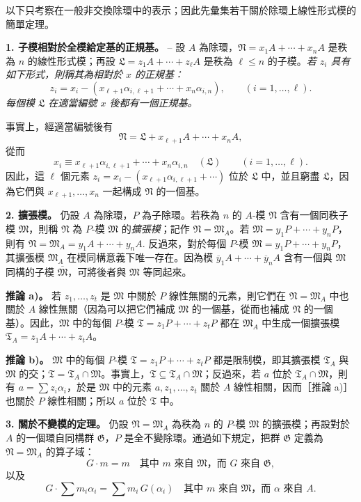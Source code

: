 \documentclass[11pt]{article}
\providecommand{\frT}{\mathfrak T}
\providecommand{\frM}{\mathfrak M}
\providecommand{\frN}{\mathfrak N}
\providecommand{\frG}{\mathfrak G}
\providecommand{\frL}{\mathfrak L}
\begin{document}
以下只考察在一般非交換除環中的表示；因此先彙集若干關於除環上線性形式模的簡單定理。

\noindent\textbf{1. 子模相對於全模給定基的正規基。} -- 設 \(A\) 為除環，\(\frN=x_1A+\cdots+x_nA\) 是秩為 \(n\) 的線性形式模；再設 \(\frL=z_1A+\cdots+z_\ell A\) 是秩為 \(\ell\le n\) 的子模。\emph{若 \(z_i\) 具有如下形式，則稱其為相對於 \(x\) 的正規基：}
\[
        z_i=x_i-(x_{\ell+1}\alpha_{i,\ell+1}+\cdots+x_n\alpha_{i,n}),
        \qquad (i=1,\ldots,\ell).
\]
\emph{每個模 \(\frL\) 在適當編號 \(x\) 後都有一個正規基。}

事實上，經適當編號後有
\[
        \frN=\frL+x_{\ell+1}A+\cdots+x_nA,
\]
從而
\[
        x_i\equiv x_{\ell+1}\alpha_{i,\ell+1}+\cdots+x_n\alpha_{i,n}
        \quad(\frL)\qquad (i=1,\ldots,\ell). \tag{2}
\]
因此，這 \(\ell\) 個元素 \(z_i=x_i-(x_{\ell+1}\alpha_{i,\ell+1}+\cdots)\) 位於 \(\frL\) 中，並且窮盡 \(\frL\)，因為它們與 \(x_{\ell+1},\ldots,x_n\) 一起構成 \(\frN\) 的一個基。

\noindent\textbf{2. 擴張模。} 仍設 \(A\) 為除環，\(P\) 為子除環。若秩為 \(n\) 的 \(A\)-模 \(\frN\) 含有一個同秩子模 \(\frM\)，則稱 \(\frN\) 為 \(P\)-模 \(\frM\) 的\emph{擴張模}；記作 \(\frN=\frM_A\)。若 \(\frM=y_1P+\cdots+y_nP\)，則有 \(\frN=\frM_A=y_1A+\cdots+y_nA.\) 反過來，對於每個 \(P\)-模 \(\frM=y_1P+\cdots+y_nP\)，其擴張模 \(\frM_A\) 在模同構意義下唯一存在。因為模 \(\overline y_1A+\cdots+\overline y_nA\) 含有一個與 \(\frM\) 同構的子模 \(\overline{\frM}\)，可將後者與 \(\frM\) 等同起來。

\noindent\textbf{推論 a)。} 若 \(z_1,\ldots,z_t\) 是 \(\frM\) 中關於 \(P\) 線性無關的元素，則它們在 \(\frN=\frM_A\) 中也關於 \(A\) 線性無關（因為可以把它們補成 \(\frM\) 的一個基，從而也補成 \(\frN\) 的一個基）。因此，\(\frM\) 中的每個 \(P\)-模 \(\frT=z_1P+\cdots+z_tP\) 都在 \(\frM_A\) 中生成一個擴張模 \(\frT_A=z_1A+\cdots+z_tA\)。

\noindent\textbf{推論 b)。} \(\frM\) 中的每個 \(P\)-模 \(\frT=z_1P+\cdots+z_tP\) 都是限制模，即其擴張模 \(\frT_A\) 與 \(\frM\) 的交；\(\frT=\frT_A\cap\frM\)。事實上，\(\frT\subseteq \frT_A\cap\frM\)；反過來，若 \(a\) 位於 \(\frT_A\cap\frM\)，則有 \(a=\sum z_i\alpha_i\)，於是 \(\frM\) 中的元素 \(a,z_1,\ldots,z_t\) 關於 \(A\) 線性相關，因而［推論 a)］也關於 \(P\) 線性相關；所以 \(a\) 位於 \(\frT\) 中。

\noindent\textbf{3. 關於不變模的定理。} 仍設 \(\frN=\frM_A\) 為秩為 \(n\) 的 \(P\)-模 \(\frM\) 的擴張模；再設對於 \(A\) 的一個環自同構群 \(\frG\)，\(P\) 是全不變除環。通過如下規定，把群 \(\frG\) 定義為 \(\frN=\frM_A\) 的算子域：
\[
        G\cdot m=m\quad\text{其中 }m\text{ 來自 }\frM\text{，而 }G\text{ 來自 }\frG,
\]
以及
\[
        G\cdot\sum m_i\alpha_i=\sum m_i\,G(\alpha_i)
        \quad\text{其中 }m\text{ 來自 }\frM\text{，而 }\alpha\text{ 來自 }A.
\]
\end{document}
